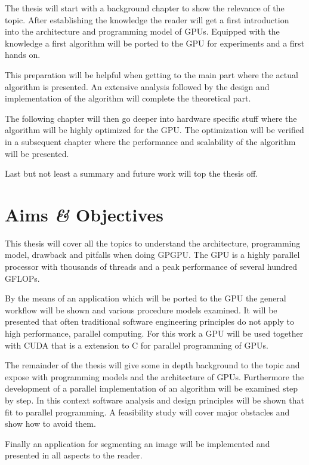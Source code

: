 
The thesis will start with a background chapter to show the relevance of the 
topic. After establishing the knowledge the reader will get a first introduction
into the architecture and programming model of \glspl{GPU}. Equipped with the 
knowledge a first algorithm will be ported to the \gls{GPU} for experiments and
a first hands on. 

This preparation will be helpful when getting to the main part where the actual
algorithm is presented. An extensive analysis followed by the design and implementation
of the algorithm will complete the theoretical part. 

The following chapter will then go deeper into hardware specific stuff where the
algorithm will be highly optimized for the \gls{GPU}. The optimization will be 
verified in a subsequent chapter where the performance and scalability of the
algorithm will be presented. 

Last but not least a summary and future work will top the thesis off. 

\section{Aims \textit{\&} Objectives} %
\label{sec:aims_\&_objectives}

This thesis will cover all the topics to understand the architecture,
programming model, drawback and pitfalls when doing \gls{GPGPU}. The \gls{GPU}
is a highly parallel processor with thousands of threads and a peak performance
of several hundred \glspl{GFLOP}.

By the means of an application which will be ported to the \gls{GPU} the general
workflow will be shown and various procedure models examined. It will be
presented that often traditional software engineering principles do not apply to
high performance, parallel computing. For this work a  \gls{GPU}
will be used together with \gls{CUDA} that is a extension to C for parallel
programming of \glspl{GPU}.

The remainder of the thesis will give some in depth background to the topic and
expose with programming models and the architecture of \glspl{GPU}. Furthermore the
development of a parallel implementation of an algorithm will be examined step
by step. In this context software analysis and design principles will be shown
that fit to parallel programming. A feasibility study will cover major obstacles
and show how to avoid them.

Finally an application for segmenting an image will be implemented and presented
in all aspects to the reader.





 



